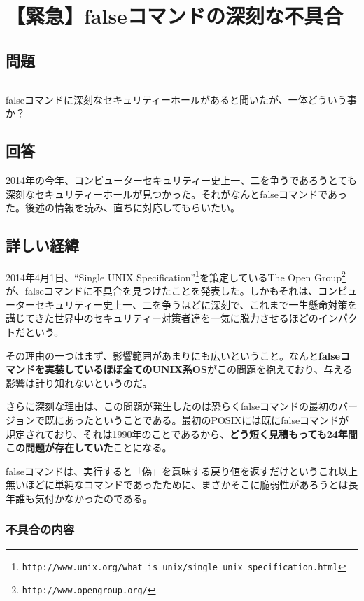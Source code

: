 \section{【緊急】falseコマンドの深刻な不具合}

\subsection*{問題}
\noindent
$\!\!\!\!\!$
\begin{grshfboxit}{160.0mm}
	falseコマンドに深刻なセキュリティーホールがあると聞いたが、一体どういう事か？
\end{grshfboxit}

\subsection*{回答}

2014年の今年、コンピューターセキュリティー史上一、二を争うであろうとても深刻なセキュリティーホールが見つかった。それがなんとfalseコマンドであった。後述の情報を読み、直ちに対応してもらいたい。


\subsection*{詳しい経緯}

2014年4月1日、``Single UNIX Specification''\footnote{\verb|http://www.unix.org/what_is_unix/single_unix_specification.html|}を策定しているThe Open Group\footnote{\verb|http://www.opengroup.org/|}が、falseコマンドに不具合を見つけたことを発表した。しかもそれは、コンピューターセキュリティー史上一、二を争うほどに深刻で、これまで一生懸命対策を講じてきた世界中のセキュリティー対策者達を一気に脱力させるほどのインパクトだという。

その理由の一つはまず、影響範囲があまりにも広いということ。なんと\textbf{falseコマンドを実装しているほぼ全てのUNIX系OS}がこの問題を抱えており、与える影響は計り知れないというのだ。

さらに深刻な理由は、この問題が発生したのは恐らくfalseコマンドの最初のバージョンで既にあったということである。最初のPOSIXには既にfalseコマンドが規定されており、それは1990年のことであるから、\textbf{どう短く見積もっても24年間この問題が存在していた}ことになる。

falseコマンドは、実行すると「偽」を意味する戻り値を返すだけというこれ以上無いほどに単純なコマンドであったために、まさかそこに脆弱性があろうとは長年誰も気付かなかったのである。

\subsubsection*{不具合の内容}

